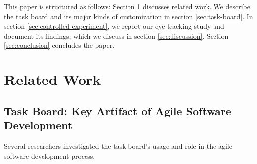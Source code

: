 \documentclass{llncs}
\begin{document}
This paper is structured as follows: Section \ref{sec:related-work} discusses 
related work. We describe the task board and its major kinds of customization 
in section \ref{sec:task-board}. In section \ref{sec:controlled-experiment}, we 
report our eye tracking study and document its findings, which we discuss in 
section \ref{sec:discussion}. Section \ref{sec:conclusion} concludes the paper.

\section{Related Work}
\label{sec:related-work}

\subsection{Task Board: Key Artifact of Agile Software Development}
Several researchers investigated the task board's usage and role in the agile 
software development process.
\end{document}
